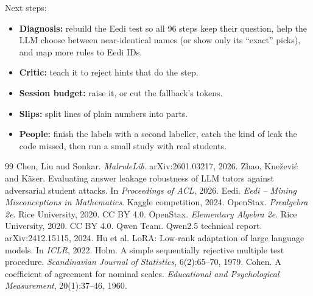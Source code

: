 \documentclass[11pt,a4paper]{article}
\begin{document}
\noindent Next steps:
\begin{itemize}
  \item \textbf{Diagnosis:} rebuild the Eedi test so all 96 steps keep their question, help the LLM choose between near-identical names (or show only its ``exact'' picks), and map more rules to Eedi IDs.
  \item \textbf{Critic:} teach it to reject hints that do the step.
  \item \textbf{Session budget:} raise it, or cut the fallback's tokens.
  \item \textbf{Slips:} split lines of plain numbers into parts.
  \item \textbf{People:} finish the labels with a second labeller, catch the kind of leak the code missed, then run a small study with real students.
\end{itemize}


\begingroup\renewcommand{\markboth}[2]{}
\begin{thebibliography}{99}
\small
{} Chen, Liu and Sonkar. \emph{MalruleLib}. arXiv:2601.03217, 2026.
 Zhao, Kne\v{z}evi\'c and K\"aser. Evaluating answer leakage robustness of LLM tutors against adversarial student attacks. In \emph{Proceedings of ACL}, 2026.
 Eedi. \emph{Eedi -- Mining Misconceptions in Mathematics}. Kaggle competition, 2024.
 OpenStax. \emph{Prealgebra 2e}. Rice University, 2020. CC BY 4.0.
 OpenStax. \emph{Elementary Algebra 2e}. Rice University, 2020. CC BY 4.0.
 Qwen Team. Qwen2.5 technical report. arXiv:2412.15115, 2024.
 Hu et al. LoRA: Low-rank adaptation of large language models. In \emph{ICLR}, 2022.
 Holm. A simple sequentially rejective multiple test procedure. \emph{Scandinavian Journal of Statistics}, 6(2):65--70, 1979.
 Cohen. A coefficient of agreement for nominal scales. \emph{Educational and Psychological Measurement}, 20(1):37--46, 1960.
\end{thebibliography}
\endgroup

\clearpage
\appendix
\end{document}
